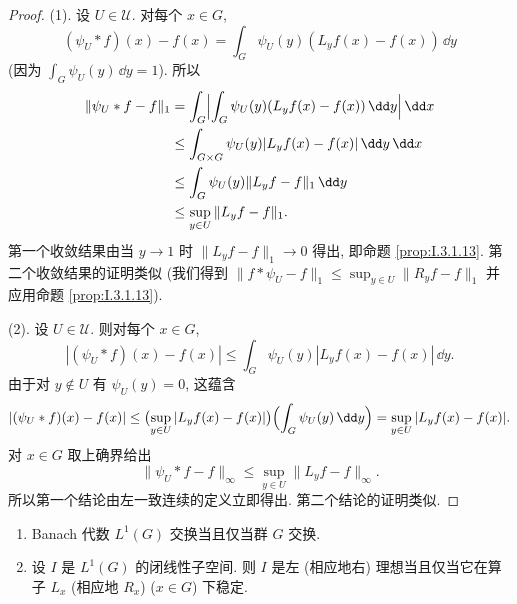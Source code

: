 \begin{proof}
(1). 设 $U \in \mathcal{U}$. 对每个 $x \in G$,
\[
(\psi_U * f)(x) - f(x) = \int_G \psi_U(y)(L_yf(x) - f(x))\,\dd y
\]
(因为 $\int_G \psi_U(y)\,\dd y = 1$). 所以
\begin{align*}
\|\psi_U * f - f\|_1 &= \int_G \Bigl|\int_G \psi_U(y)(L_yf(x) - f(x))\,\dd y\Bigr|\,\dd x \\
&\leq \int_{G \times G} \psi_U(y)|L_yf(x) - f(x)|\,\dd y\,\dd x \\
&\leq \int_G \psi_U(y)\|L_yf - f\|_1\,\dd y \\
&\leq \sup_{y \in U}\|L_yf - f\|_1.
\end{align*}
第一个收敛结果由当 $y \to 1$ 时 $\|L_yf - f\|_1 \to 0$ 得出, 即命题 \ref{prop:I.3.1.13}.
第二个收敛结果的证明类似 (我们得到 $\|f * \psi_U - f\|_1 \leq \sup_{y \in U}\|R_yf - f\|_1$ 并应用命题 \ref{prop:I.3.1.13}).

(2). 设 $U \in \mathcal{U}$. 则对每个 $x \in G$,
\[
|(\psi_U * f)(x) - f(x)| \leq \int_G \psi_U(y)|L_yf(x) - f(x)|\,\dd y.
\]
由于对 $y \notin U$ 有 $\psi_U(y) = 0$, 这蕴含
\[
|(\psi_U * f)(x) - f(x)| \leq \bigl(\sup_{y \in U}|L_yf(x) - f(x)|\bigr)\Bigl(\int_G \psi_U(y)\,\dd y\Bigr) = \sup_{y \in U}|L_yf(x) - f(x)|.
\]
对 $x \in G$ 取上确界给出
\[
\|\psi_U * f - f\|_{\infty} \leq \sup_{y \in U}\|L_yf - f\|_{\infty}.
\]
所以第一个结论由左一致连续的定义立即得出. 第二个结论的证明类似.
\end{proof}

\begin{corollary}
\label{cor:I.4.1.10}
\begin{enumerate}
\item[(1)] Banach 代数 $L^1(G)$ 交换当且仅当群 $G$ 交换.
\item[(2)] 设 $I$ 是 $L^1(G)$ 的闭线性子空间. 则 $I$ 是左 (相应地右) 理想当且仅当它在算子 $L_x$ (相应地 $R_x$) ($x \in G$) 下稳定.
\end{enumerate}
\end{corollary}

